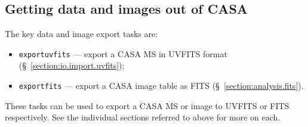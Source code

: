 \subsection{Getting data and images out of CASA}
\label{section:intro.walkthru.export}

The key data and image export tasks are:
\begin{itemize}
   \item {\tt exportuvfits} --- export a CASA MS in UVFITS format 
         (\S~\ref{section:io.import.uvfits});
   \item {\tt exportfits} --- export a CASA image table as FITS 
         (\S~\ref{section:analysis.fits}).
\end{itemize}

These tasks can be used to export a CASA MS or image to UVFITS
or FITS respectively.  See the individual sections referred to
above for more on each.

